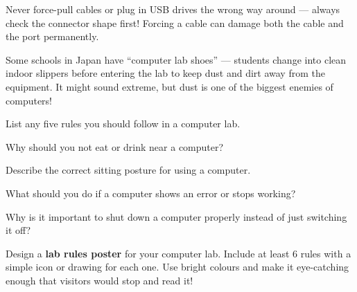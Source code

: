 \begin{warnbox}
Never force-pull cables or plug in USB drives the wrong way around --- always check the connector shape first! Forcing a cable can damage both the cable and the port permanently.
\end{warnbox}


\begin{funfact}
Some schools in Japan have ``computer lab shoes'' --- students change into clean indoor slippers before entering the lab to keep dust and dirt away from the equipment. It might sound extreme, but dust is one of the biggest enemies of computers!
\end{funfact}


\begin{reviewqs}
  \item List any five rules you should follow in a computer lab.
  \item Why should you not eat or drink near a computer?
  \item Describe the correct sitting posture for using a computer.
  \item What should you do if a computer shows an error or stops working?
  \item Why is it important to shut down a computer properly instead of just switching it off?
\end{reviewqs}

\begin{challenge}
Design a \textbf{lab rules poster} for your computer lab. Include at least 6 rules with a simple icon or drawing for each one. Use bright colours and make it eye-catching enough that visitors would stop and read it!
\end{challenge}
